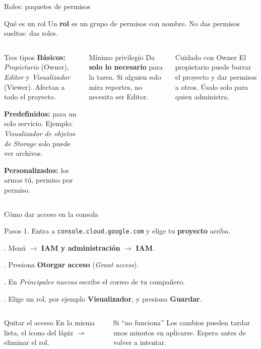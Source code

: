 \documentclass[aspectratio=169,10pt,c]{beamer}
\begin{document}
\begin{frame}{Roles: paquetes de permisos}
\begin{block}{Qué es un rol}
\small Un \textbf{rol} es un grupo de permisos con nombre. No das permisos sueltos: das roles.
\end{block}
\begin{columns}[T,onlytextwidth]
\begin{exampleblock}{Tres tipos}
\small
\textbf{Básicos:} \emph{Propietario} (Owner), \emph{Editor} y \emph{Visualizador} (Viewer). Afectan a todo el proyecto.\par\smallskip
\textbf{Predefinidos:} para un solo servicio. Ejemplo: \emph{Visualizador de objetos de Storage} solo puede ver archivos.\par\smallskip
\textbf{Personalizados:} los armas tú, permiso por permiso.
\end{exampleblock}
\begin{block}{Mínimo privilegio}
\small Da \textbf{solo lo necesario} para la tarea. Si alguien solo mira reportes, no necesita ser Editor.
\end{block}
\begin{alertblock}{Cuidado con Owner}
\small El propietario puede borrar el proyecto y dar permisos a otros. Úsalo solo para quien administra.
\end{alertblock}
\end{columns}
\end{frame}

\begin{frame}{Cómo dar acceso en la consola}
\begin{block}{Pasos}
\small
1. Entra a \texttt{console.cloud.google.com} y elige tu \textbf{proyecto} arriba.\par{}. Menú $\rightarrow$ \textbf{IAM y administración} $\rightarrow$ \textbf{IAM}.\par{}. Presiona \textbf{Otorgar acceso} (\emph{Grant access}).\par{}. En \emph{Principales nuevas} escribe el correo de tu compañero.\par{}. Elige un rol, por ejemplo \textbf{Visualizador}, y presiona \textbf{Guardar}.
\end{block}
\begin{columns}[T,onlytextwidth]
\begin{exampleblock}{Quitar el acceso}
\small En la misma lista, el ícono del lápiz $\rightarrow$ eliminar el rol.
\end{exampleblock}
\begin{alertblock}{Si ``no funciona''}
\small Los cambios pueden tardar unos minutos en aplicarse. Espera antes de volver a intentar.
\end{alertblock}
\end{columns}
\end{frame}
\end{document}

